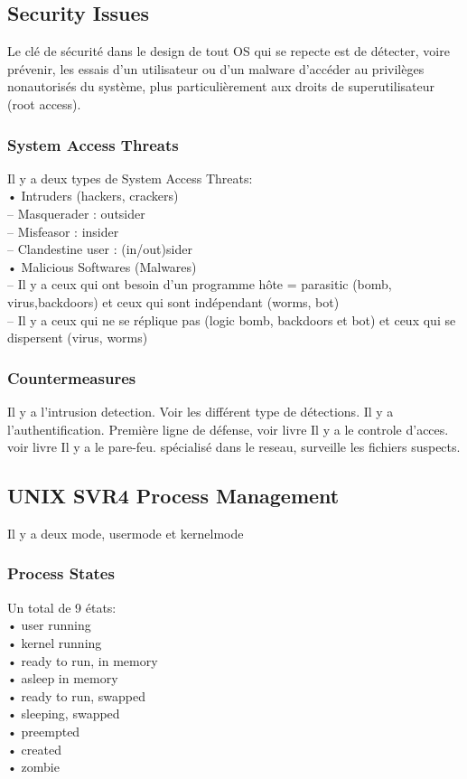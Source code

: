 \subsection{Security Issues}
Le clé de sécurité dans le design de tout OS qui se repecte est de détecter, voire prévenir, les essais d'un utilisateur ou d'un malware d'accéder au privilèges nonautorisés du système, plus particulièrement aux droits de superutilisateur (root access).
\subsubsection{System Access Threats}
Il y a deux types de System Access Threats:  \\
• Intruders (hackers, crackers) \\
– Masquerader : outsider \\
– Misfeasor : insider \\
– Clandestine user : (in/out)sider \\
• Malicious Softwares (Malwares) \\
– Il y a ceux qui ont besoin d'un programme hôte = parasitic (bomb, virus,backdoors) et ceux qui sont indépendant (worms, bot) \\
– Il y a ceux qui ne se réplique pas (logic bomb, backdoors et bot) et ceux qui se dispersent (virus, worms) \\
\subsubsection{Countermeasures}
Il y a l'intrusion detection. Voir \cite[p.~165]{stallings} les différent type de détections.
Il y a l'authentification. Première ligne de défense, voir livre Il y a le controle d'acces. voir livre Il y a le pare-feu. spécialisé dans le reseau, surveille les fichiers suspects.
\subsection{UNIX SVR4 Process Management}
Il y a deux mode, usermode et kernelmode
\subsubsection{Process States}
Un total de 9 états: \\
• user running \\
• kernel running \\
• ready to run, in memory \\
• asleep in memory \\
• ready to run, swapped \\
• sleeping, swapped \\
• preempted \\
• created \\
• zombie \\
